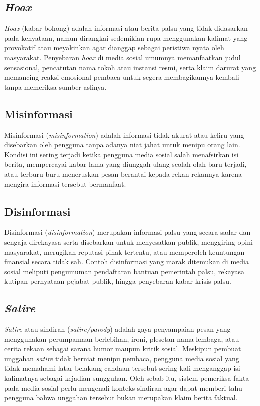 \documentclass[12pt,a4paper,twoside]{report}
\begin{document}
\subsection{\textit{Hoax}}

\textit{Hoax} (kabar bohong) adalah informasi atau berita palsu yang tidak didasarkan pada kenyataan, namun dirangkai sedemikian rupa menggunakan kalimat yang provokatif atau meyakinkan agar dianggap sebagai peristiwa nyata oleh masyarakat. Penyebaran \textit{hoax} di media sosial umumnya memanfaatkan judul sensasional, pencatutan nama tokoh atau instansi resmi, serta klaim darurat yang memancing reaksi emosional pembaca untuk segera membagikannya kembali tanpa memeriksa sumber aslinya.

\subsection{Misinformasi}

Misinformasi (\textit{misinformation}) adalah informasi tidak akurat atau keliru yang disebarkan oleh pengguna tanpa adanya niat jahat untuk menipu orang lain. Kondisi ini sering terjadi ketika pengguna media sosial salah menafsirkan isi berita, mempercayai kabar lama yang diunggah ulang seolah-olah baru terjadi, atau terburu-buru meneruskan pesan berantai kepada rekan-rekannya karena mengira informasi tersebut bermanfaat.

\subsection{Disinformasi}

Disinformasi (\textit{disinformation}) merupakan informasi palsu yang secara sadar dan sengaja direkayasa serta disebarkan untuk menyesatkan publik, menggiring opini masyarakat, merugikan reputasi pihak tertentu, atau memperoleh keuntungan finansial secara tidak sah. Contoh disinformasi yang marak ditemukan di media sosial meliputi pengumuman pendaftaran bantuan pemerintah palsu, rekayasa kutipan pernyataan pejabat publik, hingga penyebaran kabar krisis palsu.

\subsection{\textit{Satire}}

\textit{Satire} atau sindiran (\textit{satire/parody}) adalah gaya penyampaian pesan yang menggunakan perumpamaan berlebihan, ironi, plesetan nama lembaga, atau cerita rekaan sebagai sarana humor maupun kritik sosial. Meskipun pembuat unggahan \textit{satire} tidak berniat menipu pembaca, pengguna media sosial yang tidak memahami latar belakang candaan tersebut sering kali menganggap isi kalimatnya sebagai kejadian sungguhan. Oleh sebab itu, sistem pemeriksa fakta pada media sosial perlu mengenali konteks sindiran agar dapat memberi tahu pengguna bahwa unggahan tersebut bukan merupakan klaim berita faktual.
\end{document}
